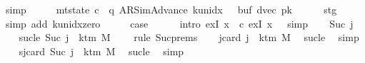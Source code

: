 \begin{isabellebody}
\ simp\isanewline
\ \ \isamarkupfalse%
\ \isamarkupfalse%
\ {\isachardoublequoteopen}mt{\isacharunderscore}{\kern0pt}state\ c{}\ {\isacharequal}{\kern0pt}\ {\isacharparenleft}{\kern0pt}q{\isacharcomma}{\kern0pt}\ AR{\isacharunderscore}{\kern0pt}SimAdvance{\isacharcomma}{\kern0pt}\ k{\isacharunderscore}{\kern0pt}unidx\ {}{\isacharcomma}{\kern0pt}\ {}{\isacharcomma}{\kern0pt}\ buf{}{\isacharcomma}{\kern0pt}\ dvec{\isacharcomma}{\kern0pt}\ {\isacharquery}{\kern0pt}pk{}{\isacharparenright}{\kern0pt}{\isachardoublequoteclose}\isanewline
\ \ \ \ \isamarkupfalse%
\ stg{}\ \isamarkupfalse%
\ {\isacharparenleft}{\kern0pt}simp\ add{\isacharcolon}{\kern0pt}\ k{\isacharunderscore}{\kern0pt}unidx{\isacharunderscore}{\kern0pt}zero{\isacharparenright}{\kern0pt}\isanewline
\ \ \isamarkupfalse%
\ \isamarkupfalse%
\ {\isacharquery}{\kern0pt}case\isanewline
\ \ \ \ \isamarkupfalse%
\ {\isacharparenleft}{\kern0pt}intro\ exI{\isacharbrackleft}{\kern0pt}\ x\ {\isacharequal}{\kern0pt}\ c{}{\isacharbrackright}{\kern0pt}\ exI{\isacharbrackleft}{\kern0pt}\ x\ {\isacharequal}{\kern0pt}\ {}{\isacharbrackright}{\kern0pt}{\isacharparenright}{\kern0pt}\ simp\isanewline
{}\isamarkupfalse%
\isanewline
\ \ \isamarkupfalse%
\ {\isacharparenleft}{\kern0pt}Suc\ j{\isacharparenright}{\kern0pt}\isanewline
\ \ \isamarkupfalse%
\ sucle{\isacharcolon}{\kern0pt}\ {\isachardoublequoteopen}Suc\ j\ {\isasymle}\ k{\isacharunderscore}{\kern0pt}tm\ M\ {\isacharminus}{\kern0pt}\ {}{\isachardoublequoteclose}\ \isamarkupfalse%
\ {\isacharparenleft}{\kern0pt}rule\ Suc{\isachardot}{\kern0pt}prems{\isacharparenright}{\kern0pt}\isanewline
\ \ \isamarkupfalse%
\ jcard{\isacharcolon}{\kern0pt}\ {\isachardoublequoteopen}j\ {\isacharless}{\kern0pt}\ k{\isacharunderscore}{\kern0pt}tm\ M{\isachardoublequoteclose}\ \isamarkupfalse%
\ sucle\ \isamarkupfalse%
\ simp\isanewline
\ \ \isamarkupfalse%
\ sjcard{\isacharcolon}{\kern0pt}\ {\isachardoublequoteopen}Suc\ j\ {\isacharless}{\kern0pt}\ k{\isacharunderscore}{\kern0pt}tm\ M{\isachardoublequoteclose}\ \isamarkupfalse%
\ sucle\ \isamarkupfalse%
\ simp\isanewline
\ \ \isamarkupfalse%

\end{isabellebody}
